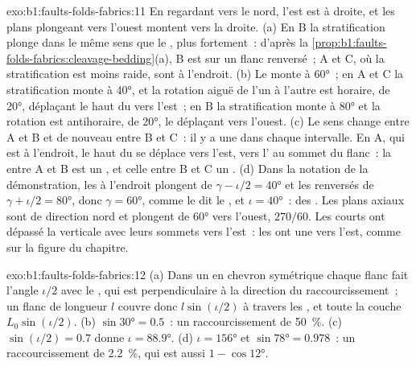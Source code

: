 \begin{solution}{exo:b1:faults-folds-fabrics:11}
En regardant vers le nord, l'est est à droite, et les plans plongeant vers l'ouest montent vers la
droite. (a) En B la stratification plonge dans le même sens que le , plus
fortement~: d'après la \cref{prop:b1:faults-folds-fabrics:cleavage-bedding}(a), B est sur un
flanc renversé~; A et C, où la stratification est moins raide, sont à
l'endroit. (b) Le  monte à \ang{60}~; en A et C la stratification monte à
\ang{40}, et la rotation aiguë de l'un à l'autre est horaire, de
\ang{20}, déplaçant le haut du  vers l'est~; en B la stratification monte
à \ang{80} et la rotation est antihoraire, de \ang{20}, le déplaçant vers
l'ouest. (c) Le sens change entre A et B et de nouveau entre B et C~:
il y a une  dans chaque intervalle. En A, qui est à l'endroit, le haut du
 se déplace vers l'est, vers l' au sommet du flanc~: la 
entre A et B est un , et celle entre B et C un .
(d) Dans la notation de la démonstration, les  à l'endroit plongent de
$\gamma - \iota/2 = \ang{40}$ et les  renversés de $\gamma + \iota/2 =
\ang{80}$, donc $\gamma = \ang{60}$, comme le dit le , et $\iota =
\ang{40}$~: des . Les plans axiaux sont de direction nord et plongent de \ang{60} vers
l'ouest,  $270/60$. Les  courts ont dépassé la verticale avec
leurs sommets vers l'est~: les  ont une  vers l'est, comme sur la figure
du chapitre.
\end{solution}

\begin{solution}{exo:b1:faults-folds-fabrics:12}
(a) Dans un  en chevron symétrique chaque flanc fait l'angle $\iota/2$ avec le
, qui est perpendiculaire à la direction du raccourcissement~; un flanc de
longueur $l$ couvre donc $l\sin(\iota/2)$ à travers les , et toute la
couche $L_0\sin(\iota/2)$. (b) $\sin\ang{30} = 0.5$~: un raccourcissement de
\qty{50}{\percent}. (c) $\sin(\iota/2) = 0.7$ donne $\iota = \ang{88.9}$.
(d) $\iota = \ang{156}$ et $\sin\ang{78} = 0.978$~: un raccourcissement de
\qty{2.2}{\percent}, qui est aussi $1 - \cos\ang{12}$.
\end{solution}

